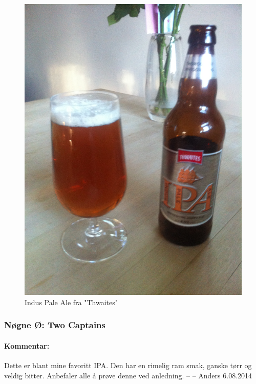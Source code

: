 \documentclass[12pt,a4paper,oneside,norsk]{article}
\begin{document}
\begin{figure} [H]
\centering
\includegraphics[scale=0.1, angle=270]{Bilder/Ol/ThwaitesIndusPaleAle.jpg}
\caption{Indus Pale Ale fra "Thwaites"}
\end{figure}

\newpage
\subsubsection{Nøgne Ø: Two Captains}
\paragraph{Kommentar:} Dette er blant mine favoritt IPA. Den har en rimelig ram smak, ganske tørr og veldig bitter. Anbefaler alle å prøve denne ved anledning. 
\newline
-- -- Anders 6.08.2014
\end{document}
